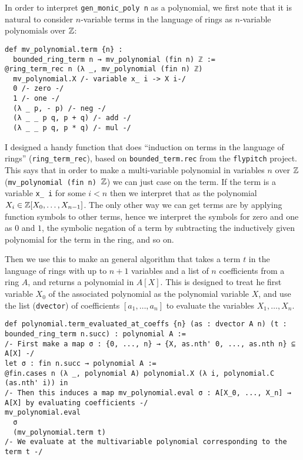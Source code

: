 In order to interpret \texttt{gen\_monic\_poly n} as a polynomial,
we first note that it is natural to consider $n$-variable terms in the language of
rings as $n$-variable polynomials over $\mathbb{Z}$:

\begin{lstlisting}
def mv_polynomial.term {n} :
  bounded_ring_term n → mv_polynomial (fin n) ℤ :=
@ring_term_rec n (λ _, mv_polynomial (fin n) ℤ)
  mv_polynomial.X /- variable x_ i -> X i-/
  0 /- zero -/
  1 /- one -/
  (λ _ p, - p) /- neg -/
  (λ _ _ p q, p + q) /- add -/
  (λ _ _ p q, p * q) /- mul -/\end{lstlisting}

I designed a handy function that does
``induction on terms in the language of rings'' (\texttt{ring\_term\_rec}),
based on \texttt{bounded\_term.rec} from the \texttt{flypitch} project.
This says that in order to make a multi-variable polynomial in variables $n$
over $\mathbb{Z}$ (\texttt{mv\_polynomial (fin n) $\mathbb{Z}$}) we can just case on the term.
If the term is a variable \texttt{x\_ i} for some $i < n$
then we interpret that as the polynomial $X_{i} \in \mathbb{Z}[X_{0},\dots,X_{n-1}]$.
The only other way we can get terms are by applying function symbols to other
terms,
hence we interpret the symbols for zero and one as $0$ and $1$,
the symbolic negation of a term by subtracting the inductively given polynomial
for the term in the ring, and so on.

Then we use this to make an general algorithm that takes
a term $t$ in the language of rings with up to $n + 1$ variables
and a list of $n$ coefficients from a ring $A$,
and returns a polynomial in $A[X]$.
This is designed to treat he first variable $X_{0}$ of the associated polynomial
as the polynomial variable $X$,
and use the list (\texttt{dvector}) of coefficients
$[a_{1},\dots,a_{n}]$ to evaluate the variables $X_{1},\dots,X_{n}$.

\begin{lstlisting}
def polynomial.term_evaluated_at_coeffs {n} (as : dvector A n) (t : bounded_ring_term n.succ) : polynomial A :=
/- First make a map σ : {0, ..., n} → {X, as.nth' 0, ..., as.nth n} ⊆ A[X] -/
let σ : fin n.succ → polynomial A :=
@fin.cases n (λ _, polynomial A) polynomial.X (λ i, polynomial.C (as.nth' i)) in
/- Then this induces a map mv_polynomial.eval σ : A[X_0, ..., X_n] → A[X] by evaluating coefficients -/
mv_polynomial.eval
  σ
  (mv_polynomial.term t)
/- We evaluate at the multivariable polynomial corresponding to the term t -/
\end{lstlisting}

